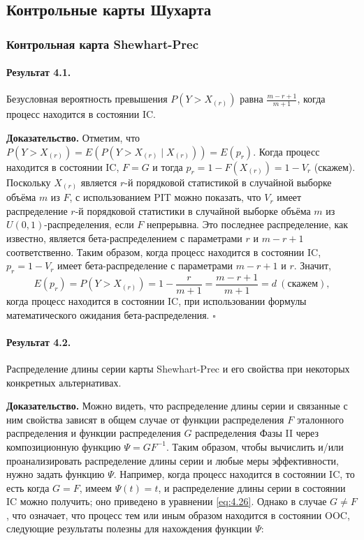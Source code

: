 \subsection{Контрольные карты Шухарта}
\subsubsection{Контрольная карта Shewhart-Prec}

\paragraph{Результат 4.1.} Безусловная вероятность превышения \(P\left( Y > X_{(r)} \right)\) равна \(\frac{m - r + 1}{m + 1}\), когда процесс находится в состоянии IC.

\noindent\textbf{Доказательство.} Отметим, что \(P\left( Y > X_{(r)} \right) = E\left( P\left( Y > X_{(r)} \mid X_{(r)} \right) \right) = E(p_r)\). Когда процесс находится в состоянии IC, \(F = G\) и тогда \(p_r = 1 - F\left( X_{(r)} \right) = 1 - V_r\) (скажем). Поскольку \(X_{(r)}\) является \(r\)-й порядковой статистикой в случайной выборке объёма \(m\) из \(F\), с использованием PIT можно показать, что \(V_r\) имеет распределение \(r\)-й порядковой статистики в случайной выборке объёма \(m\) из \(U(0, 1)\)-распределения, если \(F\) непрерывна. Это последнее распределение, как известно, является бета-распределением с параметрами \(r\) и \(m - r + 1\) соответственно. Таким образом, когда процесс находится в состоянии IC, \(p_r = 1 - V_r\) имеет бета-распределение с параметрами \(m - r + 1\) и \(r\). Значит,
\[
	E(p_r) = P\left( Y > X_{(r)} \right) = 1 - \frac{r}{m + 1} = \frac{m - r + 1}{m + 1} = d \ (\text{скажем}),
\]
когда процесс находится в состоянии IC, при использовании формулы математического ожидания бета-распределения. \(\square\)

\paragraph{Результат 4.2.} Распределение длины серии карты Shewhart-Prec и его свойства при некоторых конкретных альтернативах.

\noindent\textbf{Доказательство.} Можно видеть, что распределение длины серии и связанные с ним свойства зависят в общем случае от функции распределения \(F\) эталонного распределения и функции распределения \(G\) распределения Фазы II через композиционную функцию \(\Psi = GF^{-1}\). Таким образом, чтобы вычислить и/или проанализировать распределение длины серии и любые меры эффективности, нужно задать функцию \(\Psi\). Например, когда процесс находится в состоянии IC, то есть когда \(G = F\), имеем \(\Psi(t) = t\), и распределение длины серии в состоянии IC можно получить; оно приведено в уравнении \eqref{eq:4.26}. Однако в случае \(G \ne F\), что означает, что процесс тем или иным образом находится в состоянии OOC, следующие результаты полезны для нахождения функции \(\Psi\):

